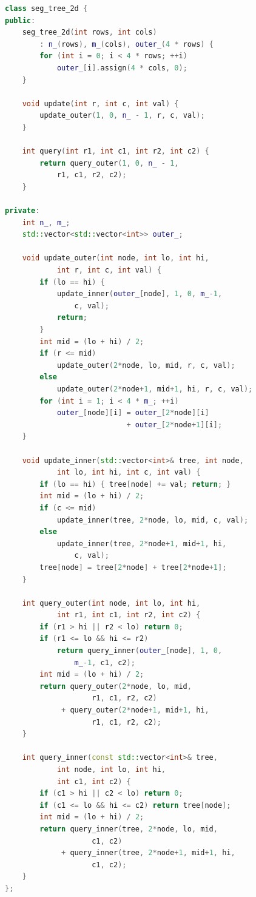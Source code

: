 \begin{lstlisting}[language=C++]
class seg_tree_2d {
public:
    seg_tree_2d(int rows, int cols)
        : n_(rows), m_(cols), outer_(4 * rows) {
        for (int i = 0; i < 4 * rows; ++i)
            outer_[i].assign(4 * cols, 0);
    }

    void update(int r, int c, int val) {
        update_outer(1, 0, n_ - 1, r, c, val);
    }

    int query(int r1, int c1, int r2, int c2) {
        return query_outer(1, 0, n_ - 1,
            r1, c1, r2, c2);
    }

private:
    int n_, m_;
    std::vector<std::vector<int>> outer_;

    void update_outer(int node, int lo, int hi,
            int r, int c, int val) {
        if (lo == hi) {
            update_inner(outer_[node], 1, 0, m_-1,
                c, val);
            return;
        }
        int mid = (lo + hi) / 2;
        if (r <= mid)
            update_outer(2*node, lo, mid, r, c, val);
        else
            update_outer(2*node+1, mid+1, hi, r, c, val);
        for (int i = 1; i < 4 * m_; ++i)
            outer_[node][i] = outer_[2*node][i]
                            + outer_[2*node+1][i];
    }

    void update_inner(std::vector<int>& tree, int node,
            int lo, int hi, int c, int val) {
        if (lo == hi) { tree[node] += val; return; }
        int mid = (lo + hi) / 2;
        if (c <= mid)
            update_inner(tree, 2*node, lo, mid, c, val);
        else
            update_inner(tree, 2*node+1, mid+1, hi,
                c, val);
        tree[node] = tree[2*node] + tree[2*node+1];
    }

    int query_outer(int node, int lo, int hi,
            int r1, int c1, int r2, int c2) {
        if (r1 > hi || r2 < lo) return 0;
        if (r1 <= lo && hi <= r2)
            return query_inner(outer_[node], 1, 0,
                m_-1, c1, c2);
        int mid = (lo + hi) / 2;
        return query_outer(2*node, lo, mid,
                    r1, c1, r2, c2)
             + query_outer(2*node+1, mid+1, hi,
                    r1, c1, r2, c2);
    }

    int query_inner(const std::vector<int>& tree,
            int node, int lo, int hi,
            int c1, int c2) {
        if (c1 > hi || c2 < lo) return 0;
        if (c1 <= lo && hi <= c2) return tree[node];
        int mid = (lo + hi) / 2;
        return query_inner(tree, 2*node, lo, mid,
                    c1, c2)
             + query_inner(tree, 2*node+1, mid+1, hi,
                    c1, c2);
    }
};
\end{lstlisting}

